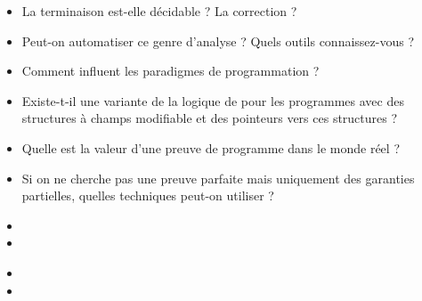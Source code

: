 \documentclass{agregfiche}
\begin{document}
\secquestionsclassiques

\begin{itemize}
	\item La terminaison est-elle décidable ? La correction ?
    \item Peut-on automatiser ce genre d'analyse ? Quels outils
    connaissez-vous ?
    \item Comment influent les paradigmes de programmation ?
    \item  Existe-t-il une variante de la logique de  pour
    les programmes avec des structures à champs modifiable et des
    pointeurs vers ces structures ?
    \item Quelle est la valeur d'une preuve de programme dans le
    monde réel ?
    \item Si on ne cherche pas une preuve parfaite mais uniquement
    des garanties partielles, quelles techniques peut-on utiliser ?

\end{itemize}

\secreferences

\begin{itemize}
\item 
\item 
\end{itemize}

\secdev

\begin{itemize}
\item 
\item 
\end{itemize}
\end{document}
